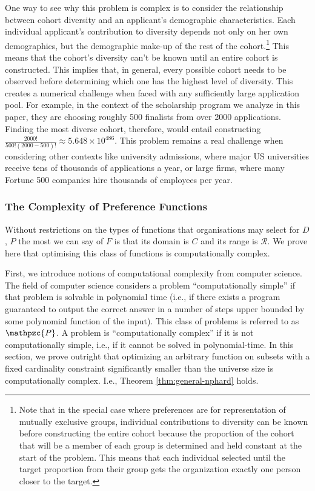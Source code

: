 One way to see why this problem is complex is to consider the relationship between cohort diversity and an applicant's demographic characteristics. Each individual applicant's contribution to diversity depends not only on her own demographics, but the demographic make-up of the rest of the cohort.\footnote{Note that in the special case where preferences are for representation of mutually exclusive groups, individual contributions to diversity can be known before constructing the entire cohort because the proportion of the cohort that will be a member of each group is determined and held constant at the start of the problem. This means that each individual selected until the target proportion from their group gets the organization exactly one person closer to the target.} This means that the cohort's diversity can't be known until an entire cohort is constructed. This implies that, in general, every possible cohort needs to be observed before determining which one has the highest level of diversity. This creates a numerical challenge when faced with any sufficiently large application pool. For example, in the context of the scholarship program we analyze in this paper, they are choosing roughly 500 finalists from over 2000 applications. Finding the most diverse cohort, therefore, would entail constructing $\frac{2000!}{500!(2000-500)!} \approx 5.648\times10^{486}$. This problem remains a real challenge when considering other contexts like university admissions, where major US universities receive tens of thousands of applications a year, or large firms, where many Fortune 500 companies hire thousands of employees per year.  

\subsubsection{The Complexity of Preference Functions}\label{subsubsec:proof_nphard}

Without restrictions on the types of functions that organisations may select for $D$, $P$ the most we can say of $F$ is that its domain is $C$ and its range is $\mathcal{R}$. We prove here that optimising this class of functions is computationally complex.

First, we introduce notions of computational complexity from computer science. The field of computer science considers a problem ``computationally simple'' if that problem is solvable in polynomial time (i.e., if there exists a program guaranteed to output the correct answer in a number of steps upper bounded by some polynomial function of the input). This class of problems is referred to as $\mathpzc{P}$. A problem is ``computationally complex'' if it is not computationally simple, i.e., if it cannot be solved in polynomial-time. In this section, we prove outright that optimizing an arbitrary function on subsets with a fixed cardinality constraint significantly smaller than the universe size is computationally complex. I.e., Theorem \ref{thm:general-nphard} holds.

